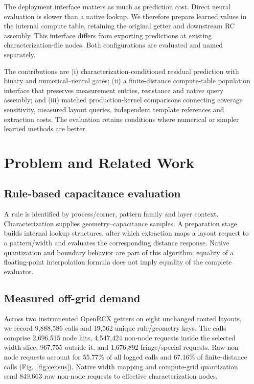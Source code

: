 \documentclass[conference,9pt,letterpaper]{IEEEtran}
\begin{document}
The deployment interface matters as much as prediction cost. Direct neural evaluation is slower than a native lookup. We therefore prepare learned values in the internal compute table, retaining the original getter and downstream RC assembly. This interface differs from exporting predictions at existing characterization-file nodes. Both configurations are evaluated and named separately.

The contributions are (i) characterization-conditioned residual prediction with binary and numerical--neural gates; (ii) a finite-distance compute-table population interface that preserves measurement entries, resistance and native query assembly; and (iii) matched production-kernel comparisons connecting coverage sensitivity, measured layout queries, independent template references and extraction costs. The evaluation retains conditions where numerical or simpler learned methods are better.

\section{Problem and Related Work}
\subsection{Rule-based capacitance evaluation}
A rule is identified by process/corner, pattern family and layer context. Characterization supplies geometry--capacitance samples. A preparation stage builds internal lookup structures, after which extraction maps a layout request to a pattern/width and evaluates the corresponding distance response. Native quantization and boundary behavior are part of this algorithm; equality of a floating-point interpolation formula does not imply equality of the complete evaluator.

\subsection{Measured off-grid demand}
Across two instrumented OpenRCX getters on eight unchanged routed layouts, we record 9,888,586 calls and 19,562 unique rule/geometry keys. The calls comprise 2,696,515 node hits, 4,547,424 non-node requests inside the selected width slice, 967,755 outside it, and 1,676,892 fringe/special requests. Raw non-node requests account for 55.77\% of all logged calls and 67.16\% of finite-distance calls (Fig.~\ref{fig:census}). Native width mapping and compute-grid quantization send 849,663 raw non-node requests to effective characterization nodes.
\end{document}
